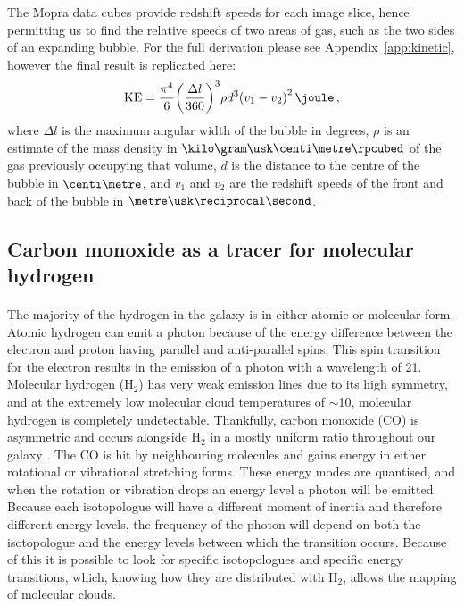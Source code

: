 \documentclass[a4paper, titlepage, oneside]{article}
\newcommand{\molec}[2]{\ensuremath{\text{#1}_{#2}}}
\begin{document}
\begin{multicols}{2}
The Mopra data cubes provide redshift speeds for each image slice, hence permitting us to find the relative speeds of two areas of gas, such as the two sides of an expanding bubble. For the full derivation please see Appendix~\ref{app:kinetic}, however the final result is replicated here:
\begin{equation}
  \label{eq:KE}
  \mathrm{KE} = \frac{\pi ^ 4}{6} {\left( \frac{\Delta l}{360} \right)}^3 \rho d^3 {(v_1 - v_2)}^2 \, \joule \, ,
\end{equation}
where \(\Delta l\) is the maximum angular width of the bubble in degrees, \(\rho\) is an estimate of the mass density in \(\kilo\gram\usk\centi\metre\rpcubed\) of the gas previously occupying that volume, \(d\) is the distance to the centre of the bubble in \(\centi\metre\), and \(v_1\) and \(v_2\) are the redshift speeds of the front and back of the bubble in \(\metre\usk\reciprocal\second\).

\subsection{Carbon monoxide as a tracer for molecular hydrogen}
\label{sec:co}
\paragraph{}
The majority of the hydrogen in the galaxy is in either atomic or molecular form. Atomic hydrogen can emit a photon because of the energy difference between the electron and proton having parallel and anti-parallel spins. This spin transition for the electron results in the emission of a photon with a wavelength of \unit{21}{\centi\metre}. Molecular hydrogen (\molec{H}{2}) has very weak emission lines due to its high symmetry, and at the extremely low molecular cloud temperatures of \(\sim\)\unit{10}{\kelvin}, molecular hydrogen is completely undetectable. Thankfully, carbon monoxide (CO) is asymmetric and occurs alongside \molec{H}{2} in a mostly uniform ratio throughout our galaxy \parencite{Neininger:1998}. The CO is hit by neighbouring molecules and gains energy in either rotational or vibrational stretching forms. These energy modes are quantised, and when the rotation or vibration drops an energy level a photon will be emitted. Because each isotopologue will have a different moment of inertia and therefore different energy levels, the frequency of the photon will depend on both the isotopologue and the energy levels between which the transition occurs. Because of this it is possible to look for specific isotopologues and specific energy transitions, which, knowing how they are distributed with \molec{H}{2}, allows the mapping of molecular clouds.


\end{multicols}
\end{document}
